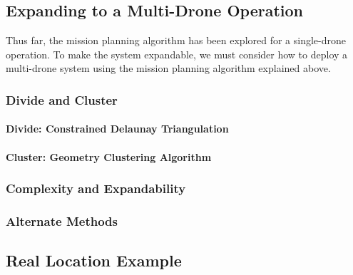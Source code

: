 \subsection{Expanding to a Multi-Drone Operation}
\label{sec:msp_multi_drone}

Thus far, the mission planning algorithm has been explored for a single-drone operation. To make the system expandable, we must consider how to deploy a multi-drone system using the mission planning algorithm explained above. 



\subsubsection{Divide and Cluster}

\paragraph{Divide: Constrained Delaunay Triangulation}

\paragraph{Cluster: Geometry Clustering Algorithm}

\subsubsection{Complexity and Expandability}

\subsubsection{Alternate Methods}


\subsection{Real Location Example}
\label{sec:msp_example}

